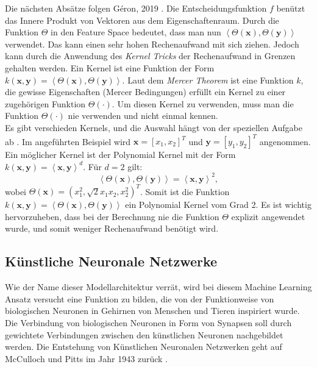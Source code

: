 Die n\"achsten Abs\"atze folgen Géron, 2019 \cite[Kapitel 5]{handson}. Die Entscheidungsfunktion $f$ ben\"utzt das Innere Produkt von Vektoren aus dem Eigenschaftenraum. Durch die Funktion $\Theta$ in den
Feature Space bedeutet, dass man nun $\left\langle \Theta(\mathbf{x}), \Theta(\mathbf{y}) \right\rangle$ verwendet. Das kann einen sehr hohen Rechenaufwand 
mit sich ziehen. Jedoch kann durch die Anwendung des \textit{Kernel Tricks} der Rechenaufwand in Grenzen gehalten werden. Ein Kernel ist eine Funktion 
der Form $k(\mathbf{x}, \mathbf{y}) = \left\langle \Theta(\mathbf{x}), \Theta(\mathbf{y}) \right\rangle$. Laut dem \textit{Mercer Theorem} ist eine Funktion 
$k$, die gewisse Eigenschaften (Mercer Bedingungen) erf\"ullt ein Kernel zu einer zugeh\"origen Funktion $\Theta(\cdot)$. Um 
diesen Kernel zu verwenden, muss man die Funktion $\Theta(\cdot)$ nie verwenden und nicht einmal kennen. \\

Es gibt verschieden Kernels, und die Auswahl h\"angt von der speziellen Aufgabe ab \cite{SVM1}. Im angef\"uhrten Beispiel wird $ \mathbf{x} = [x_1, x_2]^T$ und $\mathbf{y} = [y_1, y_2]^T$ angenommen.
Ein m\"oglicher Kernel ist der Polynomial Kernel mit der Form 
$k(\mathbf{x}, \mathbf{y}) = \left\langle \mathbf{x}, \mathbf{y} \right\rangle^d$. F\"ur $d=2$ gilt:
$$ \left\langle \Theta(\mathbf{x}), \Theta(\mathbf{y}) \right\rangle = \left\langle \mathbf{x}, \mathbf{y} \right\rangle^2, $$
wobei $\Theta(\mathbf{x}) = (x_1^2, \sqrt{2}x_1x_2, x_2^2)^T$. 
Somit ist die Funktion $k(\mathbf{x}, \mathbf{y}) = \left\langle \Theta(\mathbf{x}), \Theta(\mathbf{y}) \right\rangle$
ein Polynomial Kernel vom Grad 2. Es ist wichtig hervorzuheben, dass bei der Berechnung nie die Funktion $\Theta$ explizit angewendet wurde,
und somit weniger Rechenaufwand ben\"otigt wird. \\































\subsection{K\"unstliche Neuronale Netzwerke}
Wie der Name dieser Modellarchitektur verr\"at, wird bei diesem Machine Learning Ansatz versucht eine Funktion zu bilden, die von der Funktionweise
von biologischen Neuronen in Gehirnen von Menschen und Tieren inspiriert wurde. Die Verbindung von biologischen Neuronen in Form von Synapsen soll durch gewichtete
Verbindungen zwischen den k\"unstlichen Neuronen nachgebildet werden. Die Entstehung von K\"unstlichen Neuronalen Netzwerken 
geht auf McCulloch und Pitts im Jahr 1943 zur\"uck \cite{McCulloch}. \\

